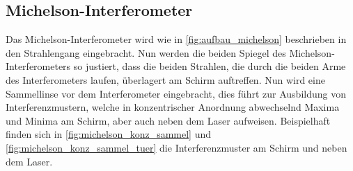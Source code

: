 \documentclass[ngerman]{scrartcl}
\begin{document}
\subsection{Michelson-Interferometer}
\label{sec:durchfuehrung_michelson}

Das Michelson-Interferometer wird wie in \autoref{fig:aufbau_michelson} beschrieben in den Strahlengang eingebracht. Nun werden die beiden Spiegel des Michelson-Interferometers so justiert, dass die beiden Strahlen, die durch die beiden Arme des Interferometers laufen, überlagert am Schirm auftreffen. Nun wird eine Sammellinse vor dem Interferometer eingebracht, dies führt zur Ausbildung von Interferenzmustern, welche in konzentrischer Anordnung abwechselnd Maxima und Minima am Schirm, aber auch neben dem Laser aufweisen. Beispielhaft finden sich in \autoref{fig:michelson_konz_sammel} und \autoref{fig:michelson_konz_sammel_tuer} die Interferenzmuster am Schirm und neben dem Laser.
%
\setcapindent{0pt}
\end{document}
